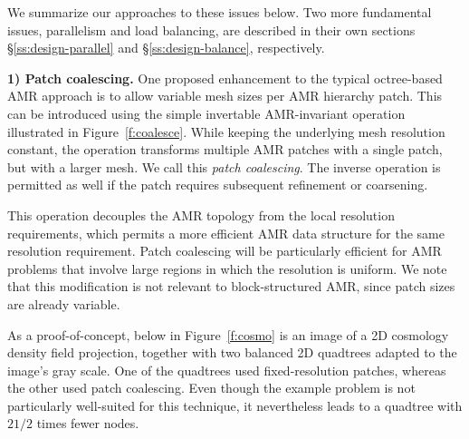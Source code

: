 \documentclass[10pt,twocolumn]{article}
\begin{document}
We summarize our approaches to these issues below.  Two more
fundamental issues, parallelism and load balancing, are described in
their own sections \S\ref{ss:design-parallel} and
\S\ref{ss:design-balance}, respectively.


\textbf{1) Patch coalescing.} One proposed enhancement to the typical
octree-based AMR approach is to allow variable mesh sizes per AMR
hierarchy patch.  This can be introduced using the simple invertable
AMR-invariant operation illustrated in Figure~\ref{f:coalesce}.  While
keeping the underlying mesh resolution constant, the operation
transforms multiple AMR patches with a single patch, but with a larger
mesh.  We call this \textit{patch coalescing}.  The inverse operation
is permitted as well if the patch requires subsequent refinement or
coarsening.




This operation decouples the AMR topology from the local resolution
requirements, which permits a more efficient AMR data structure for
the same resolution requirement.  Patch coalescing will be
particularly efficient for AMR problems that involve large regions
in which the resolution is uniform.  We note that this modification
is not relevant to block-structured AMR, since patch sizes are already
variable.

As a proof-of-concept, below in Figure~\ref{f:cosmo} is an image of a
2D cosmology density field projection, together with two balanced 2D
quadtrees adapted to the image's gray scale.  One of the quadtrees
used fixed-resolution patches, whereas the other used patch
coalescing.  Even though the example problem is not particularly
well-suited for this technique, it nevertheless leads to a quadtree
with $2 1/2$ times fewer nodes.
\end{document}
